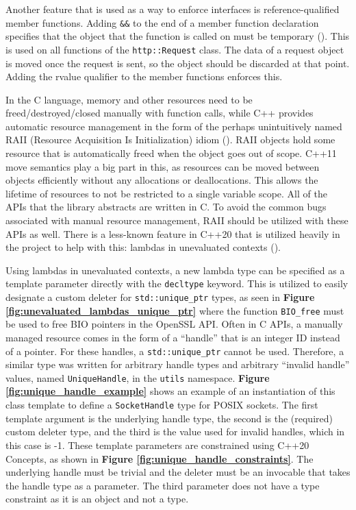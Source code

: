 \documentclass[12pt, a4paper]{article}
\begin{document}
Another feature that is used as a way to enforce interfaces is reference-qualified member functions. Adding \texttt{\&\&} to the end of a member function declaration specifies that the object that the function is called on must be temporary (\cite{CppMemberFunctions}). This is used on all functions of the \texttt{http::Request} class. The data of a request object is moved once the request is sent, so the object should be discarded at that point. Adding the rvalue qualifier to the member functions enforces this.

In the C language, memory and other resources need to be freed/destroyed/closed manually with function calls, while C++ provides automatic resource management in the form of the perhaps unintuitively named RAII (Resource Acquisition Is Initialization) idiom (\cite{CppRAII}). RAII objects hold some resource that is automatically freed when the object goes out of scope. C++11 move semantics play a big part in this, as resources can be moved between objects efficiently without any allocations or deallocations. This allows the lifetime of resources to not be restricted to a single variable scope. All of the APIs that the library abstracts are written in C. To avoid the common bugs associated with manual resource management, RAII should be utilized with these APIs as well. There is a less-known feature in C++20 that is utilized heavily in the project to help with this: lambdas in unevaluated contexts (\cite{UnevaluatedLambdas}).

Using lambdas in unevaluated contexts, a new lambda type can be specified as a template parameter directly with the \texttt{decltype} keyword. This is utilized to easily designate a custom deleter for \texttt{std::unique\_ptr} types, as seen in \textbf{Figure \ref{fig:unevaluated_lambdas_unique_ptr}} where the function \texttt{BIO\_free} must be used to free BIO pointers in the OpenSSL API. Often in C APIs, a manually managed resource comes in the form of a “handle” that is an integer ID instead of a pointer. For these handles, a \texttt{std::unique\_ptr} cannot be used. Therefore, a similar type was written for arbitrary handle types and arbitrary “invalid handle” values, named \texttt{UniqueHandle}, in the \texttt{utils} namespace. \textbf{Figure \ref{fig:unique_handle_example}} shows an example of an instantiation of this class template to define a \texttt{SocketHandle} type for POSIX sockets. The first template argument is the underlying handle type, the second is the (required) custom deleter type, and the third is the value used for invalid handles, which in this case is -1. These template parameters are constrained using C++20 Concepts, as shown in \textbf{Figure \ref{fig:unique_handle_constraints}}. The underlying handle must be trivial and the deleter must be an invocable that takes the handle type as a parameter. The third parameter does not have a type constraint as it is an object and not a type.
\end{document}
